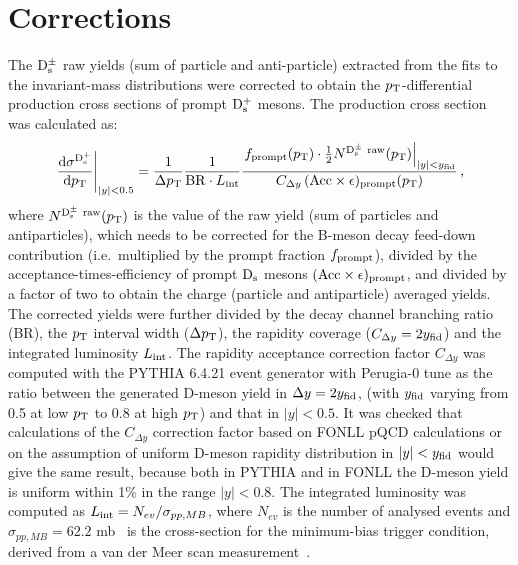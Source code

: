 \section{Corrections}
\label{sec:corrPP}
The ${\rm D_s^{\pm}}$ raw yields (sum of particle and anti-particle) extracted from the fits to the invariant-mass distributions
were corrected to obtain the $p_{\rm T}$-differential production cross sections of prompt
 ${\rm D_s^+}$ mesons. The production cross section was calculated as:
\begin{equation}
  \label{eq:dsdpt}
  \left.\frac{{\rm d} \sigma^{\rm D^{+}_{\rm s}}}{{\rm d}p_{\rm T}}\right|_{|y|<0.5}=
  \frac{1}{ \Delta p_{\rm T}}\frac{1}{{\rm BR} \cdot L_{\rm int}}\frac{\left.f_{\rm prompt}(p_{\rm T})\cdot \frac{1}{2} N^{\rm D^\pm_{\rm s}~raw}(p_{\rm T})\right|_{|y|<y_{\rm fid}}}{ C_{\Delta y} \,({\rm Acc}\times\epsilon)_{\rm prompt}(p_{\rm T})}\,,
\end{equation}
where $N^{\rm D^\pm_{\rm s}~raw}(p_{\rm T})$ is the value of the raw yield 
(sum of particles and antiparticles),
 which needs to be corrected for the B-meson decay feed-down contribution 
(i.e.\ multiplied by the prompt fraction $f_{\rm{prompt}}$), divided by the 
acceptance-times-efficiency of prompt ${\rm D_s}$ mesons 
$(\rm Acc \times \epsilon)_{\rm{prompt}}$, and divided by a factor of two to 
obtain the charge (particle and antiparticle) averaged yields.
The corrected yields were further divided by the decay channel branching ratio (BR), 
the $p_{\rm T}$ interval width ($\Delta p_{\rm T}$), the rapidity coverage 
($C_{\Delta y} = 2 y_{\rm fid}$) and the integrated luminosity $L_{\rm int}$.
The rapidity acceptance correction factor $C_{\Delta y}$ was computed with the PYTHIA 6.4.21 event generator
with Perugia-0 tune as the ratio between the generated D-meson yield in $\Delta y = 2y_{\rm fid}$, 
(with $y_{\rm fid}$ varying from 0.5 at low $p_{\rm T}$ to 0.8 at high $p_{\rm T}$) 
and that in $|y| < 0.5$. It was checked that calculations of the $C_{\Delta y}$ correction 
factor based on FONLL pQCD calculations or on the assumption of uniform D-meson
rapidity distribution in $|y| < y_{\rm fid}$ would give the same result, 
because both in PYTHIA and in FONLL the D-meson yield is uniform within 1\% in the range $|y| < 0.8$.
The integrated luminosity was computed as $L_{\rm int} = N_{ev}/\sigma_{pp,MB}$,
where $N_{ev}$ is the number of analysed events and 
$\sigma_{pp,MB} = 62.2$ mb~\cite{Abelev:2012sea}
is the cross-section for the minimum-bias trigger condition, derived from
a van der Meer scan measurement~\cite{vanderMeer:296752}.

